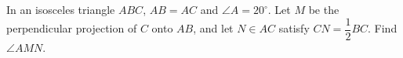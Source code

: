 In an isosceles triangle $ABC$, $AB=AC$ and $\angle A=20^\circ$. Let $M$ be the perpendicular projection of $C$ onto $AB$, and let $N\in AC$ satisfy $CN=\dfrac{1}{2}BC$. Find $\angle AMN$.
